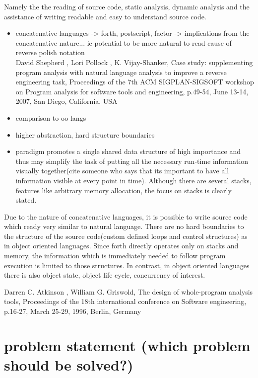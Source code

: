 Namely the the reading of source code, static analysis, dynamic analysis and the assistance of writing readable and easy to understand source code.

\begin{itemize}
\item concatenative languages -> forth, postscript, factor -> implications from the concatenative nature... ie potential to be more natural to read cause of reverse polish notation \\
	David Shepherd , Lori Pollock , K. Vijay-Shanker, Case study: supplementing program analysis with natural language analysis to improve a reverse engineering task, Proceedings of the 7th ACM SIGPLAN-SIGSOFT workshop on Program analysis for software tools and engineering, p.49-54, June 13-14, 2007, San Diego, California, USA
\item comparison to oo langs
\item higher abstraction, hard structure boundaries
\item paradigm promotes a single shared data structure of high importance and thus may simplify the task of putting all the necessary run-time information visually together(cite someone who says that its important to have all information visible at every point in time). Although there are several stacks, features like arbitrary memory allocation, the focus on stacks is clearly stated.
\end{itemize}

Due to the nature of concatenative languages, it is possible to write source code which ready very similar to natural language. There are no hard boundaries to the structure of the source code(custom defined loops and control structures) as in object oriented languages. Since forth directly operates only on stacks and memory, the information which is immediately needed to follow program execution is limited to those structures. In contrast, in object oriented languages there is also object state, object life cycle, concurrency of interest.

Darren C. Atkinson , William G. Griswold, The design of whole-program analysis tools, Proceedings of the 18th international conference on Software engineering, p.16-27, March 25-29, 1996, Berlin, Germany

\section{problem statement (which problem should be solved?)}

